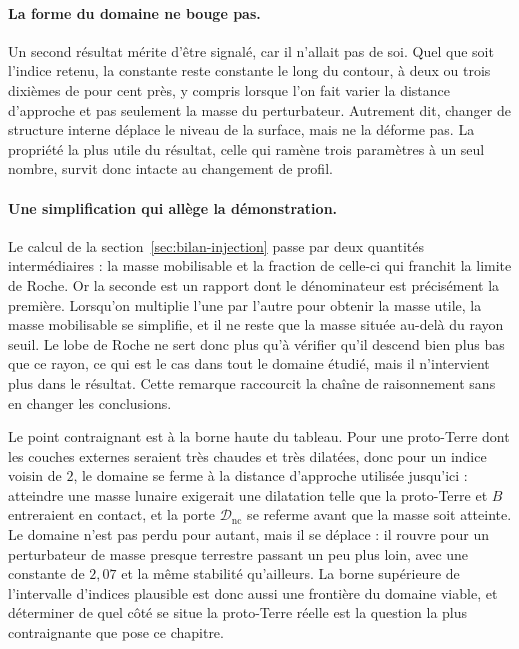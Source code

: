 \documentclass[11pt,a4paper,openany]{report}
\begin{document}
\paragraph{La forme du domaine ne bouge pas.} Un second résultat mérite d'être signalé, car il
n'allait pas de soi. Quel que soit l'indice retenu, la constante reste constante le long du
contour, à deux ou trois dixièmes de pour cent près, y compris lorsque l'on fait varier la distance
d'approche et pas seulement la masse du perturbateur. Autrement dit, changer de structure interne
déplace le niveau de la surface, mais ne la déforme pas. La propriété la plus utile du résultat,
celle qui ramène trois paramètres à un seul nombre, survit donc intacte au changement de profil.

\paragraph{Une simplification qui allège la démonstration.} Le calcul de la
section~\ref{sec:bilan-injection} passe par deux quantités intermédiaires : la masse mobilisable et
la fraction de celle-ci qui franchit la limite de Roche. Or la seconde est un rapport dont le
dénominateur est précisément la première. Lorsqu'on multiplie l'une par l'autre pour obtenir la
masse utile, la masse mobilisable se simplifie, et il ne reste que la masse située au-delà du rayon
seuil. Le lobe de Roche ne sert donc plus qu'à vérifier qu'il descend bien plus bas que ce rayon,
ce qui est le cas dans tout le domaine étudié, mais il n'intervient plus dans le résultat. Cette
remarque raccourcit la chaîne de raisonnement sans en changer les conclusions.

\begin{controle}
Le point contraignant est à la borne haute du tableau. Pour une proto-Terre dont les couches
externes seraient très chaudes et très dilatées, donc pour un indice voisin de $2$, le domaine se
ferme à la distance d'approche utilisée jusqu'ici : atteindre une masse lunaire exigerait une
dilatation telle que la proto-Terre et $B$ entreraient en contact, et la porte $\mathcal{D}_{\mathrm{nc}}$
se referme avant que la masse soit atteinte. Le domaine n'est pas perdu pour autant, mais il se
déplace : il rouvre pour un perturbateur de masse presque terrestre passant un peu plus loin, avec
une constante de $2{,}07$ et la même stabilité qu'ailleurs. La borne supérieure de l'intervalle
d'indices plausible est donc aussi une frontière du domaine viable, et déterminer de quel côté se
situe la proto-Terre réelle est la question la plus contraignante que pose ce chapitre.
\end{controle}
\end{document}
